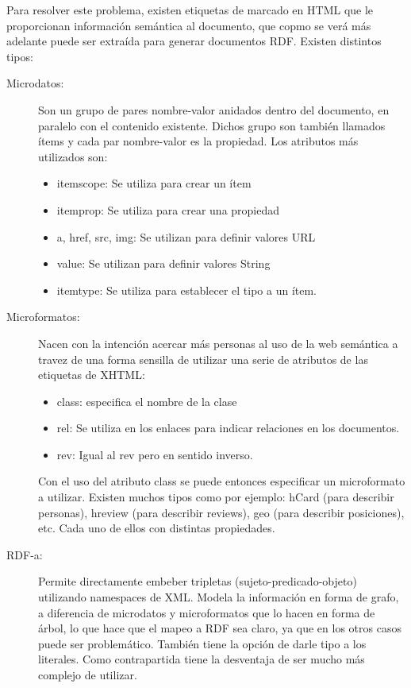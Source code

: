Para resolver este problema, existen etiquetas de marcado en HTML que le proporcionan información semántica al documento, que copmo se verá más adelante 
puede ser extraída para generar documentos RDF. Existen distintos tipos:
\begin{description}
  \item[Microdatos:]\cite{Hickson2012} Son un grupo de pares nombre-valor anidados dentro del documento, en paralelo con el contenido existente. Dichos grupo son 
también llamados ítems y cada par nombre-valor es la propiedad. Los atributos más utilizados son:
  \begin{itemize}
    \item itemscope: Se utiliza para crear un ítem
    \item itemprop: Se utiliza para crear una propiedad
    \item a, href, src, img: Se utilizan para definir valores URL
    \item value: Se utilizan para definir valores String
    \item itemtype: Se utiliza para establecer el tipo a un ítem.
  \end{itemize}

  \item[Microformatos:] Nacen con la intención acercar más personas al uso de la web semántica a travez de una forma sensilla de utilizar 
una serie de atributos de las etiquetas de XHTML:

  \begin{itemize}
    \item class: especifica el nombre de la clase

    \item rel: Se utiliza en los enlaces para indicar relaciones en los documentos.

    \item rev: Igual al rev pero en sentido inverso.
  \end{itemize}
  
Con el uso del atributo class se puede entonces especificar un microformato a utilizar. Existen muchos tipos como por ejemplo: hCard (para describir 
personas), hreview (para describir reviews), geo (para describir posiciones), etc. Cada uno de ellos con distintas propiedades.

\item[RDF-a:]\cite{Celik}Permite directamente embeber tripletas (sujeto-predicado-objeto) utilizando namespaces de XML. Modela la información en forma de grafo, 
a diferencia de microdatos y microformatos que lo hacen en forma de árbol, lo que hace que el mapeo a RDF sea claro, ya que en los otros casos puede ser problemático.
También tiene la opción de darle tipo a los literales. Como contrapartida tiene la desventaja de ser mucho más complejo de utilizar. 
\end{description}


